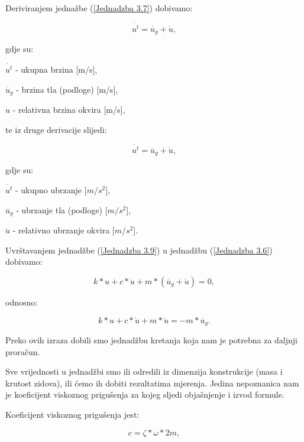 \documentclass[12pt]{book}
\begin{document}
Deriviranjem jednažbe (\ref{Jednadzba 3.7}) dobivamo:

\begin{equation}\label{Jednadzba 3.8}
	\dot{u^t} = \dot{u_g} + \dot{u},
\end{equation}

gdje su:

$\dot{u^t}$ - ukupna brzina [m/s],

$\dot{u_g}$ - brzina tla (podloge) [m/s],

$\dot{u}$ - relativna brzina okvira [m/s],

te iz druge derivacije slijedi:

\begin{equation}\label{Jednadzba 3.9}
	\ddot{u^t} = \ddot{u_g} + \ddot{u},
\end{equation}

gdje su:

$\ddot{u^t}$ - ukupno ubrzanje [$m/s^2$],

$\ddot{u_g}$ - ubrzanje tla (podloge) [$m/s^2$],

$\ddot{u}$ - relativno ubrzanje okvira [$m/s^2$].

Uvrštavanjem jednadžbe (\ref{Jednadzba 3.9}) u jednadžbu (\ref{Jednadzba 3.6}) dobivamo:

\begin{equation}\label{Jednadzba 3.10}
	k*u + c*\dot{u} + m*(\ddot{u_g} + \ddot{u}) = 0,
\end{equation}

odnosno:

\begin{equation}\label{Jednadzba 3.11}
	k*u + c*\dot{u} + m*\ddot{u} = - m*\ddot{u_g}.
\end{equation}

Preko ovih izraza dobili smo jednadžbu kretanja koja nam je potrebna za daljnji proračun.

Sve vrijednosti u jednadžbi smo ili odredili iz dimenzija konstrukcije (masa i krutost zidova), ili ćemo ih dobiti rezultatima mjerenja. Jedina nepoznanica nam je koeficijent viskoznog prigušenja za kojeg sljedi objašnjenje i izvod formule.

\newpage



Koeficijent viskoznog prigušenja jest:

\begin{equation}\label{Jednadzba 3.12}
	c = \zeta * \omega *2m,
\end{equation}
\end{document}
